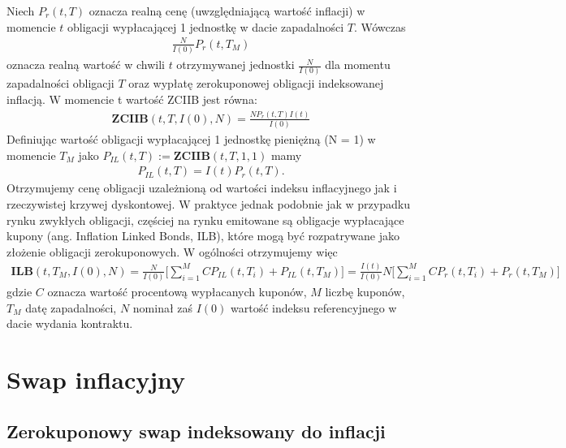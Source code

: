 \documentclass{mini}
\theoremstyle{mythstyle}
\begin{document}
	Niech $P_r(t,T)$ oznacza realną cenę (uwzględniającą wartość inflacji) w momencie $t$ obligacji wypłacającej 1 jednostkę w dacie zapadalności $T$. Wówczas
	\begin{eqnarray}
		\frac{N}{I(0)} P_r(t,T_M) 
	\end{eqnarray}
	oznacza realną wartość w chwili $t$ otrzymywanej jednostki $\frac{N}{I(0)}$ dla momentu zapadalności obligacji $T$ oraz wypłatę zerokuponowej obligacji indeksowanej inflacją. W momencie t wartość ZCIIB jest równa:
	\begin{eqnarray}
		 \mathbf{ZCIIB}(t,T,I(0),N) = \frac{N P_r(t,T) I(t)}{I(0)} 
	 \end{eqnarray}
	Definiując wartość obligacji wypłacającej 1 jednostkę pieniężną (N = 1) w momencie $T_M$ jako $P_{IL}(t,T) := \mathbf{ZCIIB}(t,T,1,1)$ mamy
	\begin{eqnarray}
		P_{IL}(t,T) = I(t) P_r(t,T).
	\end{eqnarray}
	Otrzymujemy cenę obligacji uzależnioną od wartości indeksu inflacyjnego jak i rzeczywistej krzywej dyskontowej. 
	W praktyce jednak podobnie jak w przypadku rynku zwykłych obligacji, częściej na rynku emitowane są obligacje wypłacające kupony (ang. Inflation Linked Bonds, ILB), które mogą być rozpatrywane jako złożenie obligacji zerokuponowych. W ogólności otrzymujemy więc
	\begin{eqnarray*}
		\mathbf{ILB}(t,T_M,I(0),N) = \frac{N}{I(0)} \bigg[ \sum_{i=1}^M C P_{IL}(t,T_i) + P_{IL}(t,T_M)\bigg]
									 = \frac{I(t)}{I(0)}N \bigg[ \sum_{i=1}^M C P_{r}(t,T_i) + P_{r}(t,T_M)\bigg]
	\end{eqnarray*}
	gdzie $C$ oznacza wartość procentową wypłacanych kuponów, $M$ liczbę kuponów, $T_M$ datę zapadalności, $N$ nominał zaś $I(0)$ wartość indeksu referencyjnego w dacie wydania kontraktu.
		
	\section{Swap inflacyjny}
		
	\subsection{Zerokuponowy swap indeksowany do inflacji}
		
\end{document}

